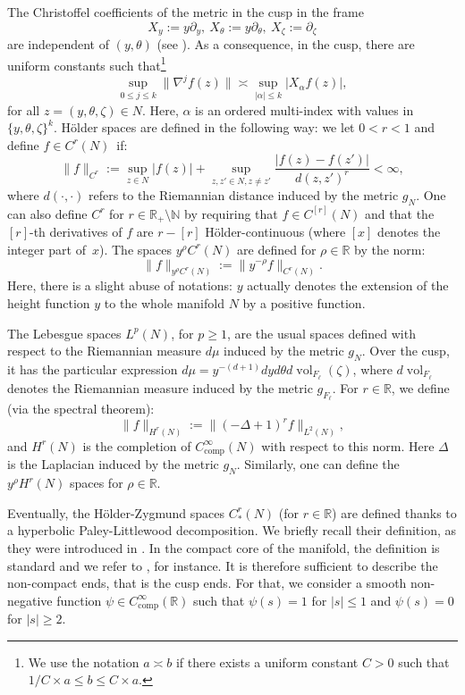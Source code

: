 \documentclass[JEP,XML,SOM,Unicode,NoFloatCountersInSection]{cedram}
\newcommand{\R}{\mathbb{R}}
\newcommand{\N}{\mathbb{N}}
\DeclareMathOperator{\vol}{\mathrm{vol}}
\theoremstyle{plain}
\theoremstyle{definition}
\begin{document}
The Christoffel coefficients of the metric in the cusp in the frame
\[
X_y := y\partial_y,\ X_\theta:= y\partial_\theta,\ X_\zeta:= \partial_\zeta
\]
are independent of $(y,\theta)$ (see \cite[App.\,A.3.2]{Bonthonneau-15}). As a consequence, in the cusp, there are uniform constants such that\footnote{We use the notation $a \asymp b$ if there exists a uniform constant $C > 0$ such that $1/C \times a \leq b \leq C \times a$.}
\begin{equation}\label{eq:equivalent-local-Ck-norm}
\sup_{0 \leq j \leq k} \|\nabla^j f(z)\| \asymp\sup_{|\alpha| \leq k} |X_\alpha f(z)|,
\end{equation}
for all $z=(y,\theta,\zeta) \in N$. Here, $\alpha$ is an ordered multi-index with values in $\{y,\theta,\zeta\}^k$. Hölder spaces are defined in the following way: we let $0 \!<\! r\! <\! 1$ and define $f \!\in\! C^r(N)$~if:
\[
\|f\|_{C^r} := \sup_{z \in N} |f(z)| + \sup_{z,z' \in N, z \neq z'} \frac{|f(z)-f(z')|}{d(z,z')^r} < \infty,
\]
where $d(\cdot,\cdot)$ refers to the Riemannian distance induced by the metric $g_N$. One can also define $C^r$ for $r \in \R_+ \setminus \N$ by requiring that $f \in C^{[r]}(N)$ and that the $[r]$-th derivatives of $f$ are $r-[r]$ Hölder-continuous (where $[x]$ denotes the integer part of~$x$). The spaces $y^\rho C^r(N)$ are defined for $\rho \in \R$ by the norm:
\[
\|f\|_{y^\rho C^r(N)} := \|y^{-\rho}f\|_{C^r(N)}.
\]
Here, there is a slight abuse of notations: $y$ actually denotes the extension of the height function $y$ to the whole manifold $N$ by a positive function.

The Lebesgue spaces $L^p(N)$, for $p \geq 1$, are the usual spaces defined with respect to the Riemannian measure $d\mu$ induced by the metric $g_N$. Over the cusp, it has the particular expression $d\mu = y^{-(d+1)} dy d\theta d\vol_{F_\ell}(\zeta)$, where $d\vol_{F_\ell}$ denotes the Riemannian measure induced by the metric $g_{F_\ell}$. For $r \in \R$, we define (via the spectral theorem):
\begin{equation}
\label{equation:norm-sobolev}
\|f\|_{H^r(N)}:= \|(-\Delta+1)^rf\|_{L^2(N)},
\end{equation}
and $H^r(N)$ is the completion of $C_{\mathrm{comp}}^\infty(N)$ with respect to this norm. Here $\Delta$ is the Laplacian induced by the metric $g_N$. Similarly, one can define the $y^\rho H^r(N)$ spaces for $\rho \in \R$.

Eventually, the Hölder-Zygmund spaces $C^r_\ast(N)$ (for $r \in \R$) are defined thanks to a hyperbolic Paley-Littlewood decomposition. We briefly recall their definition, as they were introduced in \cite{Bonthonneau-Lefeuvre-19-1}. In the compact core of the manifold, the definition is standard and we refer to \cite{Taylor-III-96edition}, for instance. It is therefore sufficient to describe the non-compact ends, that is the cusp ends. For that, we consider a smooth non-negative function $\psi \in C^\infty_{\mathrm{comp}}(\R)$ such that $\psi(s) = 1$ for $|s| \leq 1$ and $\psi(s) = 0$ for $|s| \geq 2$.
\end{document}
